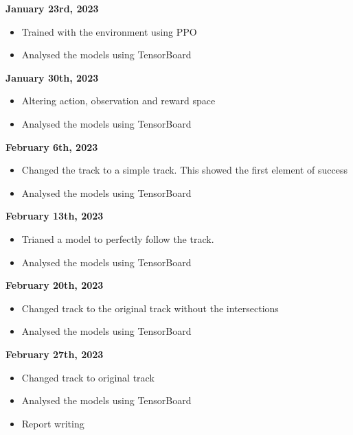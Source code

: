 \documentclass[a4paper,12pt]{article}
\begin{document}
\vspace{.7cm}
\textbf{\large January 23rd, 2023}
\begin{itemize}
  \item Trained with the environment using PPO 
  \item Analysed the models using TensorBoard

\end{itemize}
\vspace{.7cm}
\textbf{\large January 30th, 2023}
\begin{itemize}
  \item Altering action, observation and reward space
  \item Analysed the models using TensorBoard


\end{itemize}
\vspace{.7cm}
\textbf{\large February 6th, 2023}
\begin{itemize}
  \item Changed the track to a simple track. This showed the first element of success
  \item Analysed the models using TensorBoard


\end{itemize}
\vspace{.7cm}
\textbf{\large February 13th, 2023}
\begin{itemize}
  \item Trianed a model to perfectly follow the track.
  \item Analysed the models using TensorBoard


\end{itemize}
\vspace{.7cm}
\textbf{\large February 20th, 2023}
\begin{itemize}
  \item Changed track to the original track without the intersections
  \item Analysed the models using TensorBoard
\end{itemize}
\vspace{.7cm}
\textbf{\large February 27th, 2023}
\begin{itemize}
  \item Changed track to original track 
  \item Analysed the models using TensorBoard
  \item Report writing 

\end{itemize}
\vspace{.7cm}
\end{document}
